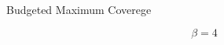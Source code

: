 \begin{frame}{Budgeted Maximum Coverege}
    \begin{center}
        $$
        \beta = 4
        $$
        
    \end{center}
\end{frame}